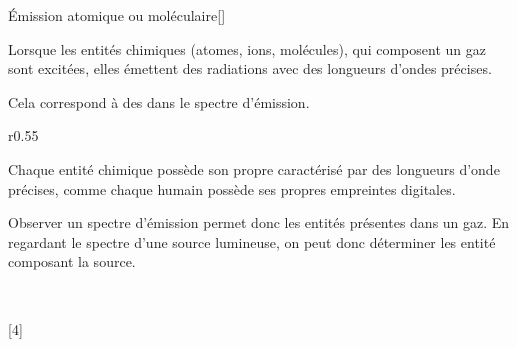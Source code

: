 \begin{doc}{Émission atomique ou moléculaire}[\label{doc:emission_atomique}]
  \begin{importants}
    Lorsque les entités chimiques (atomes, ions, molécules), qui composent un gaz sont excitées, elles émettent des radiations avec des longueurs d'ondes précises.
    
    Cela correspond à des  dans le spectre d'émission.
  \end{importants}
  
  \begin{wrapfigure}[10]{r}{0.55\linewidth}
    \centering
    \vspace*{-22pt}
  \end{wrapfigure}
    
  Chaque entité chimique possède son propre  caractérisé par des longueurs d'onde précises, comme chaque humain possède ses propres empreintes digitales.

  Observer un spectre d'émission permet donc  les entités présentes dans un gaz.
  En regardant le spectre d'une source lumineuse, on peut donc déterminer les entité composant la source.

  \begin{center}
     \\[-4pt]
  \end{center}
\end{doc}


[4]